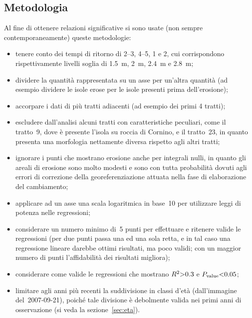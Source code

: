 \subsection{Metodologia}
Al fine di ottenere relazioni significative si sono usate (non sempre contemporaneamente) queste metodologie:
%
\begin{itemize}
	\item tenere conto dei tempi di ritorno di \SIrange[range-phrase = {-}, range-units = single]{2}{3}{\mesi}, \SIrange[range-phrase = {-}, range-units = single]{4}{5}{\mesi}, \SI{1}{\anno} e \SI{2}{\anni}, cui corrispondono rispettivamente livelli soglia di \SI{1.5}{\m}, \SI{2}{\m}, \SI{2.4}{\m} e \SI{2.8}{\m};
	\item dividere la quantità rappresentata su un asse per un'altra quantità (ad esempio dividere le isole erose per le isole presenti prima dell'erosione);
	\item accorpare i dati di più tratti adiacenti (ad esempio dei primi 4 tratti);
	\item escludere dall'analisi alcuni tratti con caratteristiche peculiari, come il tratto~9, dove è presente l'isola su roccia di Cornino, e il tratto~23, in quanto presenta una morfologia nettamente diversa rispetto agli altri tratti;
	\item ignorare i punti che mostrano erosione anche per integrali nulli, in quanto gli areali di erosione sono molto modesti e sono con tutta probabilità dovuti agli errori di correzione della georeferenziazione attuata nella fase di elaborazione del cambiamento;
	\item applicare ad un asse una scala logaritmica in base~\num{10} per utilizzare leggi di potenza nelle regressioni;
	\item considerare un numero minimo di~5 punti per effettuare e ritenere valide le regressioni (per due punti passa una ed una sola retta, e in tal caso una regressione lineare darebbe ottimi risultati, ma poco validi; con un maggior numero di punti l'affidabilità dei risultati migliora);
	\item considerare come valide le regressioni che mostrano $R^2 \num{> 0.3}$ e $P_\mathrm{value} \num{< 0.05}$;
	\item limitare agli anni più recenti la suddivisione in classi d'età (dall'immagine del~2007-09-21), poiché tale divisione è debolmente valida nei primi anni di osservazione (si veda la sezione~\ref{sec:eta}).
\end{itemize}
